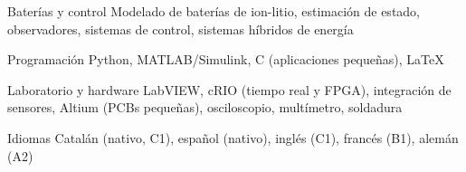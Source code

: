 
\begin{cvskills}

  \cvskill
    {Bater\'ias y control}
    {Modelado de bater\'ias de ion-litio, estimaci\'on de estado, observadores, sistemas de control, sistemas h\'ibridos de energ\'ia}

  \cvskill
    {Programaci\'on}
    {Python, MATLAB/Simulink, C (aplicaciones peque\~nas), LaTeX}

  \cvskill
    {Laboratorio y hardware}
    {LabVIEW, cRIO (tiempo real y FPGA), integraci\'on de sensores, Altium (PCBs peque\~nas), osciloscopio, mult\'imetro, soldadura}

  \cvskill
    {Idiomas}
    {Catal\'an (nativo, C1), espa\~nol (nativo), ingl\'es (C1), franc\'es (B1), alem\'an (A2)}

\end{cvskills}
